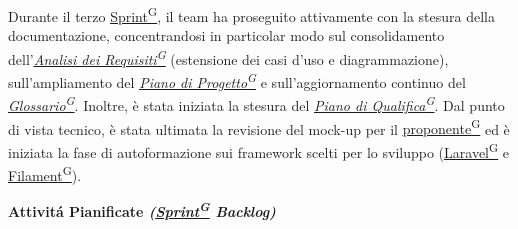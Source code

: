 \documentclass[a4paper,12pt]{article}
\providecommand{\glslink}[2]{\href{https://alittlebyte-19.github.io/Documentazione/glossario.html\#gls-#1}{\underline{#2}\textsuperscript{\scriptsize G}}}
\begin{document}
Durante il terzo \glslink{sprint}{Sprint}, il team ha proseguito attivamente con la stesura della documentazione, concentrandosi in particolar modo sul consolidamento dell'\textit{\glslink{analisi-dei-requisiti-adr}{Analisi dei Requisiti}} (estensione dei casi d'uso e diagrammazione), sull'ampliamento del \textit{\glslink{piano-di-progetto}{Piano di Progetto}} e sull'aggiornamento continuo del \textit{\glslink{glossario}{Glossario}}. Inoltre, è stata iniziata la stesura del \textit{\glslink{piano-di-qualifica}{Piano di Qualifica}}. Dal punto di vista tecnico, è stata ultimata la revisione del mock-up per il \glslink{committente-proponente}{proponente} ed è iniziata la fase di autoformazione sui framework scelti per lo sviluppo (\glslink{laravel}{Laravel} e \glslink{filament}{Filament}).

\begin{center}
\noindent\textbf{Attivitá Pianificate \textit{(\glslink{sprint}{Sprint} Backlog)}}\\
\end{center}
\end{document}
